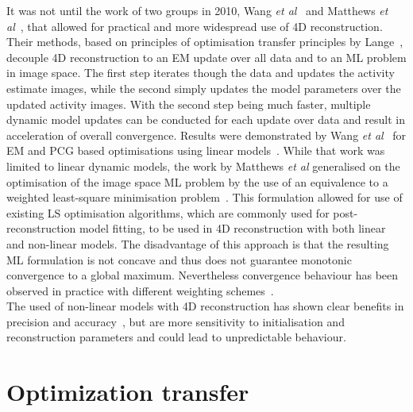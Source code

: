 It was not until the work of two groups in 2010, Wang \textit{et al}~\cite{Wang2010} and Matthews \textit{et al}~\cite{Matthews2010}, that allowed for practical and more widespread use of 4D reconstruction. Their methods, based on principles of optimisation transfer principles by Lange~\cite{Lange2000}, decouple 4D reconstruction to an EM update over all data and to an ML problem in image space. The first step iterates though the data and updates the activity estimate images, while the second simply updates the model parameters over the  updated activity images. With the second step being much faster, multiple dynamic model updates can be conducted for each update over data and result in acceleration of overall convergence. Results were demonstrated by Wang \textit{et al}~\cite{Wang2010} for EM and PCG based optimisations using linear models~\cite{Wang2010}. While that work was limited to linear dynamic models, the work by Matthews \textit{et al} generalised on the optimisation of the image space ML problem by the use of an equivalence to a weighted least-square minimisation problem~\cite{Matthews2010}. This formulation allowed for use of existing LS optimisation algorithms, which are commonly used for post-reconstruction model fitting, to be used in 4D reconstruction with both linear and non-linear models. The disadvantage of this approach is that the resulting ML formulation is not concave and thus does not guarantee monotonic convergence to a global maximum. Nevertheless convergence behaviour has been observed in practice with different weighting schemes~\cite{Gravel2015,Wang2013}. \\
The used of non-linear models with 4D reconstruction has shown clear benefits in precision and accuracy~\cite{Angelis2014,Kotasidis2012,Gravel2015}, but are more sensitivity to initialisation and reconstruction parameters and could lead to unpredictable behaviour.



\section{Optimization transfer}
%

